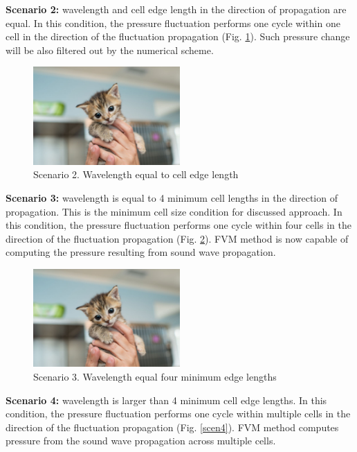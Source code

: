\textbf{Scenario 2:} wavelength and cell edge length in the direction of propagation are equal. In this condition, the pressure fluctuation performs one cycle within one cell in the direction of the fluctuation propagation (Fig. \ref{scen2}). Such pressure change will be also filtered out by the numerical scheme.

\begin{figure}[h!]
\centering %
\includegraphics[width=0.5\textwidth]{Pictures/kitten-placeholder.jpg}
\caption{Scenario 2. Wavelength equal to cell edge length}
\label{scen2}
\end{figure}

\textbf{Scenario 3:} wavelength is equal to 4 minimum cell lengths in the direction of propagation. This is the minimum cell size condition for discussed approach. In this condition, the pressure fluctuation performs one cycle within four cells in the direction of the fluctuation propagation (Fig. \ref{scen3}). FVM method is now capable of computing the pressure resulting from sound wave propagation.

\begin{figure}[h!]
\centering %
\includegraphics[width=0.5\textwidth]{Pictures/kitten-placeholder.jpg}
\caption{Scenario 3. Wavelength equal four minimum edge lengths}
\label{scen3}
\end{figure}

\textbf{Scenario 4:} wavelength is larger than 4 minimum cell edge lengths. In this condition, the pressure fluctuation performs one cycle within multiple cells in the direction of the fluctuation propagation (Fig. \ref{scen4}). FVM method computes pressure from the sound wave propagation across multiple cells.

